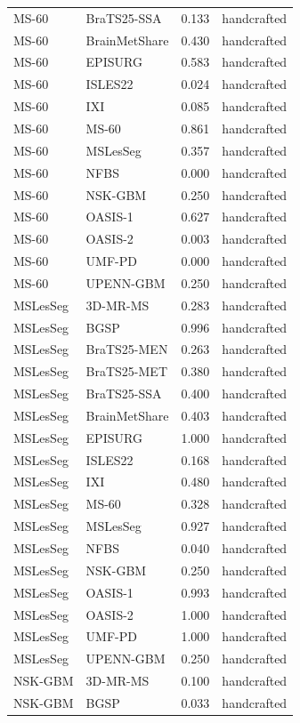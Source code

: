 \begin{tabular}{llrl}
MS-60 & BraTS25-SSA & 0.133 & handcrafted \\
MS-60 & BrainMetShare & 0.430 & handcrafted \\
MS-60 & EPISURG & 0.583 & handcrafted \\
MS-60 & ISLES22 & 0.024 & handcrafted \\
MS-60 & IXI & 0.085 & handcrafted \\
MS-60 & MS-60 & 0.861 & handcrafted \\
MS-60 & MSLesSeg & 0.357 & handcrafted \\
MS-60 & NFBS & 0.000 & handcrafted \\
MS-60 & NSK-GBM & 0.250 & handcrafted \\
MS-60 & OASIS-1 & 0.627 & handcrafted \\
MS-60 & OASIS-2 & 0.003 & handcrafted \\
MS-60 & UMF-PD & 0.000 & handcrafted \\
MS-60 & UPENN-GBM & 0.250 & handcrafted \\
MSLesSeg & 3D-MR-MS & 0.283 & handcrafted \\
MSLesSeg & BGSP & 0.996 & handcrafted \\
MSLesSeg & BraTS25-MEN & 0.263 & handcrafted \\
MSLesSeg & BraTS25-MET & 0.380 & handcrafted \\
MSLesSeg & BraTS25-SSA & 0.400 & handcrafted \\
MSLesSeg & BrainMetShare & 0.403 & handcrafted \\
MSLesSeg & EPISURG & 1.000 & handcrafted \\
MSLesSeg & ISLES22 & 0.168 & handcrafted \\
MSLesSeg & IXI & 0.480 & handcrafted \\
MSLesSeg & MS-60 & 0.328 & handcrafted \\
MSLesSeg & MSLesSeg & 0.927 & handcrafted \\
MSLesSeg & NFBS & 0.040 & handcrafted \\
MSLesSeg & NSK-GBM & 0.250 & handcrafted \\
MSLesSeg & OASIS-1 & 0.993 & handcrafted \\
MSLesSeg & OASIS-2 & 1.000 & handcrafted \\
MSLesSeg & UMF-PD & 1.000 & handcrafted \\
MSLesSeg & UPENN-GBM & 0.250 & handcrafted \\
NSK-GBM & 3D-MR-MS & 0.100 & handcrafted \\
NSK-GBM & BGSP & 0.033 & handcrafted \\

\end{tabular}
